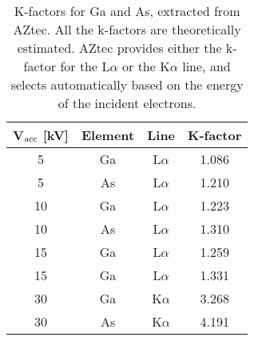
\begin{table}
    \centering
    \caption{
        K-factors for Ga and As, extracted from AZtec.
        All the k-factors are theoretically estimated.
        AZtec provides either the k-factor for the L$\alpha$ or the K$\alpha$ line, and selects automatically based on the energy of the incident electrons.
    }
    \label{tab:results:k-factors}
    \begin{tabular}{cccc}
        V$_\textnormal{acc}$ [kV] & Element & Line      & K-factor \\
        \hline
        5                         & Ga      & L$\alpha$ & 1.086    \\
        5                         & As      & L$\alpha$ & 1.210    \\
        10                        & Ga      & L$\alpha$ & 1.223    \\
        10                        & As      & L$\alpha$ & 1.310    \\
        15                        & Ga      & L$\alpha$ & 1.259    \\
        15                        & Ga      & L$\alpha$ & 1.331    \\
        30                        & Ga      & K$\alpha$ & 3.268    \\
        30                        & As      & K$\alpha$ & 4.191
    \end{tabular}
\end{table}